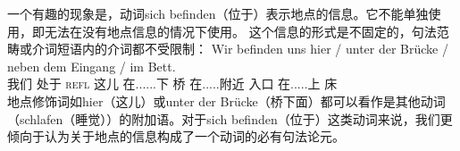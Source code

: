 一个有趣的现象是，动词sich befinden（位于）表示地点的信息。它不能单独使用，即无法在没有地点信息的情况下使用。
\z
这个信息的形式是不固定的，句法范畴或介词短语内的介词都不受限制：
\ea
\gll Wir befinden uns hier / unter der Brücke / neben dem Eingang / im Bett.\\
	 我们 处于 \textsc{refl} 这儿 {} 在......下  桥 {} 在.....附近  入口 {} 在.....上 床\\
\z
地点修饰词如hier（这儿）或unter der Brücke（桥下面）都可以看作是其他动词（\egc schlafen（睡觉））的附加语。对于sich befinden（位于）这类动词来说，我们更倾向于认为关于地点的信息构成了一个动词的必有句法论元。
%
%
